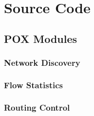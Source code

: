 \chapter{Source Code}

\section{POX Modules}

\subsection{Network Discovery}


\subsection{Flow Statistics}


\subsection{Routing Control}

